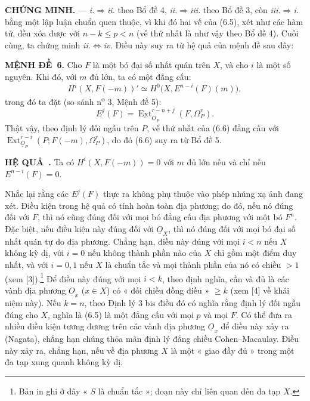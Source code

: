\documentclass[11pt,twoside,openany]{book}
\numberwithin{equation}{section}
\newcommand{\src}[1]{%
  \phantomsection\hypertarget{src:\fgasourceid:#1}{}%
  \marginpar{\raggedleft\footnotesize\sffamily #1}%
}
\newcommand{\fgasourceid}{unset}
\newcommand{\Osh}{\underline{O}}
\newcommand{\Extsh}{\underline{\operatorname{Ext}}}
\newcommand{\result}[2]{\par\medskip\noindent\textbf{#1\if\relax\detokenize{#2}\relax\else\ #2\fi.}\quad}
\begin{document}
\noindent\textbf{CHỨNG MINH.} --- \textit{i.}$\Rightarrow$\textit{ii.} theo
Bổ đề 4, \textit{ii.}$\Rightarrow$\textit{iii.} theo Bổ đề 3, còn
\textit{iii.}$\Rightarrow$\textit{i.} bằng một lập luận chuẩn quen thuộc,
vì khi đó hai vế của (6.5), xét như các hàm tử, đều xóa được với
$n-k\leq p<n$ (vế thứ nhất là như vậy theo Bổ đề 4). Cuối cùng, ta chứng minh
\textit{ii.}$\Leftrightarrow$\textit{iv.} Điều này suy ra từ hệ quả của
mệnh đề sau đây:

\result{MỆNH ĐỀ}{6} Cho $F$ là một bó đại số nhất quán trên $X$, và cho
$i$ là một số nguyên. Khi đó, với $m$ đủ lớn, ta có một đẳng cấu:
\begin{equation}\tag{6.6}
  H^{i}(X,F(-m))'
  \simeq H^{0}\bigl(X,E^{n-i}(F)(m)\bigr),
\end{equation}
trong đó ta đặt (so sánh n\textsuperscript{o} 3, Mệnh đề 5):
\begin{equation}\tag{6.7}
  E^{j}(F)=\Extsh_{\Osh_P}^{r-n+j}(F,\Omega_P^{r}).
\end{equation}
Thật vậy, theo định lý đối ngẫu trên $P$, vế thứ nhất của (6.6)
đẳng cấu với
$\operatorname{Ext}_{\Osh_P}^{r-i}(P;F(-m),\Omega_P^{r})$, do đó (6.6) suy ra
từ Bổ đề 5.

\src{187}
\result{HỆ QUẢ}{} Ta có $H^{i}(X,F(-m))=0$ với $m$ đủ lớn nếu và chỉ nếu
$E^{n-i}(F)=0$.

Nhắc lại rằng các $E^{j}(F)$ thực ra không phụ thuộc vào phép nhúng xạ ảnh
đang xét. Điều kiện trong hệ quả có tính hoàn toàn địa phương; do đó,
nếu nó đúng đối với $F$, thì nó cũng đúng đối với mọi bó đẳng cấu địa phương
với một bó $F^{n}$. Đặc biệt, nếu điều kiện này đúng
đối với $\Osh_X$, thì nó đúng đối với mọi bó đại số nhất quán tự do địa phương.
Chẳng hạn, điều này đúng với mọi $i<n$ nếu $X$ không kỳ dị, với
$i=0$ nếu không thành phần nào của $X$ chỉ gồm một điểm duy nhất, và với $i=0,1$
nếu $X$ là chuẩn tắc và mọi thành phần của nó có chiều $>1$ (xem
[3]).\footnote{Bản in ghi ở đây « $S$ là chuẩn tắc »; đoạn này
chỉ liên quan đến đa tạp $X$.} Để điều này đúng với mọi
$i<k$, theo định nghĩa, cần và đủ là các vành địa phương
$\Osh_x$ ($x\in X$) có « đối chiều đồng điều » $\geq k$ (xem [4]
về khái niệm này). Nếu $k=n$, theo Định lý 3 bis điều đó có nghĩa rằng
định lý đối ngẫu đúng cho $X$, nghĩa là (6.5) là một đẳng cấu với
mọi $p$ và mọi $F$. Có thể đưa ra nhiều điều kiện tương đương trên
các vành địa phương $\Osh_x$ để điều này xảy ra (Nagata), chẳng hạn chúng
thỏa mãn định lý đẳng chiều Cohen--Macaulay. Điều này xảy ra,
chẳng hạn, nếu về địa phương $X$ là một « giao đầy đủ » trong một
đa tạp xung quanh không kỳ dị.
\end{document}
